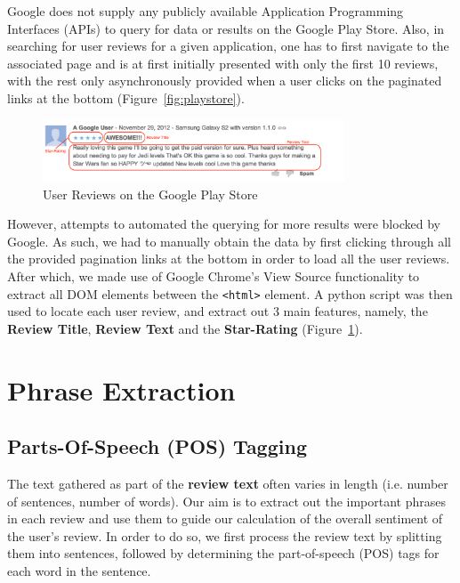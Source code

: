\documentclass[11pt]{report} %
\begin{document}
Google does not supply any publicly available Application Programming Interfaces (APIs) to query for data or results on the Google Play Store. Also, in searching for user reviews for a given application, one has to first navigate to the associated page and is at first initially presented with only the first 10 reviews, with the rest only asynchronously provided when a user clicks on the paginated links at the bottom (Figure~\ref{fig:playstore}). 

\begin{figure}[h!]
  \centering
    \includegraphics[width=0.8\textwidth]{figures/user_review.png}
 \caption{User Reviews on the Google Play Store}
\label{fig:user_review}
\end{figure}

However, attempts to automated the querying for more results were blocked by Google. As such, we had to manually obtain the data by first clicking through all the provided pagination links at the bottom in order to load all the user reviews. After which, we made use of Google Chrome's View Source functionality to extract all DOM elements between the \verb|<html>| element. A python script was then used to locate each user review, and extract out 3 main features, namely, the \textbf{Review Title}, \textbf{Review Text} and the \textbf{Star-Rating} (Figure~\ref{fig:user_review}).

\section{Phrase Extraction}
\label{subsection:phrase_extraction}
\subsection{Parts-Of-Speech (POS) Tagging}
The text gathered as part of the \textbf{review text} often varies in length (i.e. number of sentences, number of words). Our aim is to extract out the important phrases in each review and use them to guide our calculation of the overall sentiment of the user's review. In order to do so, we first process the review text by splitting them into sentences, followed by determining the part-of-speech (POS) tags for each word in the sentence. 
\end{document}
